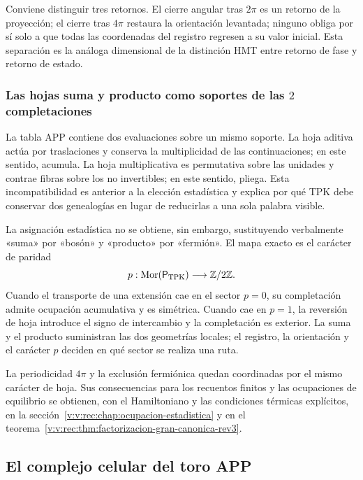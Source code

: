 Conviene distinguir tres retornos. El cierre angular tras \(2\pi\) es un
retorno de la proyección; el cierre tras \(4\pi\) restaura la orientación
levantada; ninguno obliga por sí solo a que todas las coordenadas del registro
regresen a su valor inicial. Esta separación es la análoga dimensional de la
distinción HMT entre retorno de fase y retorno de estado.

\subsubsection{Las hojas suma y producto como soportes de las \(2\) completaciones}
\label{v:v:rec:completaciones:section:06}

La tabla APP contiene dos evaluaciones sobre un mismo soporte. La hoja
aditiva actúa por traslaciones y conserva la multiplicidad de las
continuaciones; en este sentido, acumula. La hoja multiplicativa es
permutativa sobre las unidades y contrae fibras sobre los no invertibles; en
este sentido, pliega. Esta incompatibilidad es anterior a la elección
estadística y explica por qué TPK debe conservar dos genealogías en lugar de
reducirlas a una sola palabra visible.

La asignación estadística no se obtiene, sin embargo, sustituyendo
verbalmente «suma» por «bosón» y «producto» por «fermión». El mapa exacto es
el carácter de paridad
\[
 p:\operatorname{Mor}(\mathsf P_{\rm TPK})\longrightarrow\mathbb Z/2\mathbb Z.
\]
Cuando el transporte de una extensión cae en el sector \(p=0\), su
completación admite ocupación acumulativa y es simétrica. Cuando cae en
\(p=1\), la reversión de hoja introduce el signo de intercambio y la
completación es exterior. La suma y el producto suministran las dos
geometrías locales; el registro, la orientación y el carácter \(p\) deciden en
qué sector se realiza una ruta.

La periodicidad \(4\pi\) y la exclusión fermiónica quedan coordinadas por
el mismo carácter de hoja. Sus consecuencias para los recuentos finitos y
las ocupaciones de equilibrio se obtienen, con el Hamiltoniano y las
condiciones térmicas explícitos, en la
sección~\ref{v:v:rec:chap:ocupacion-estadistica} y en el
teorema~\ref{v:v:rec:thm:factorizacion-gran-canonica-rev3}.

\subsection{El complejo celular del toro APP}
\label{v:v:rec:completaciones:section:08}

